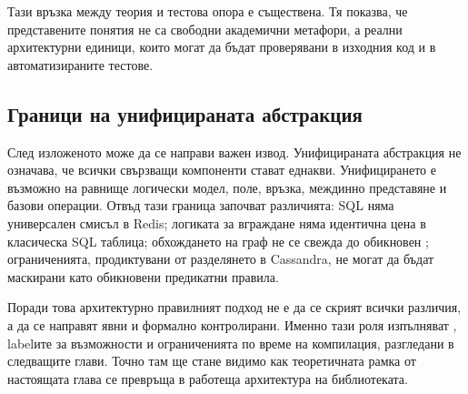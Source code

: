 Тази връзка между теория и тестова опора е съществена. Тя показва, че представените понятия не са свободни академични метафори, а реални архитектурни единици, които могат да бъдат проверявани в изходния код и в автоматизираните тестове.

\subsection{Граници на унифицираната абстракция}

След изложеното може да се направи важен извод. Унифицираната абстракция не означава, че всички свързващи компоненти стават еднакви. Унифицирането е възможно на равнище логически модел, поле, връзка, междинно представяне и базови операции. Отвъд тази граница започват различията: SQL  няма универсален смисъл в Redis; логиката за вграждане няма идентична цена в класическа SQL таблица; обхождането на граф не се свежда до обикновен ; ограниченията, продиктувани от разделянето в Cassandra, не могат да бъдат маскирани като обикновени предикатни правила.

Поради това архитектурно правилният подход не е да се скрият всички различия, а да се направят явни и формално контролирани. Именно тази роля изпълняват , labelите за възможности и ограниченията по време на компилация, разгледани в следващите глави. Точно там ще стане видимо как теоретичната рамка от настоящата глава се превръща в работеща архитектура на библиотеката.
